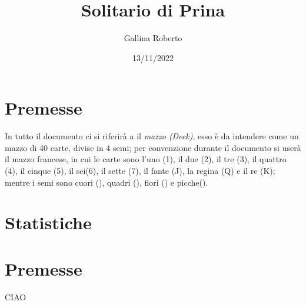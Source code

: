 \documentclass[a4paper]{article}
\begin{document}
\begin{titlepage}
    \title{Solitario di Prina}
    \author{Gallina Roberto}
    \date{13/11/2022}
    \maketitle
\end{titlepage}

\newpage

\tableofcontents

\newpage

\section{Premesse}
In tutto il documento ci si riferirà a il \emph{mazzo (Deck)}, esso è da intendere come un mazzo di 40 carte, divise in 4 semi; per convenzione durante il documento si userà il mazzo francese, in cui le carte sono l'uno (1), il due (2), il tre (3), il quattro (4), il cinque (5), il sei(6), il sette (7), il fante (J), la regina (Q) e il re (K); mentre i semi sono cuori (), quadri (), fiori () e picche().




\section{Statistiche}



\section{Premesse}

CIAO
\end{document}
